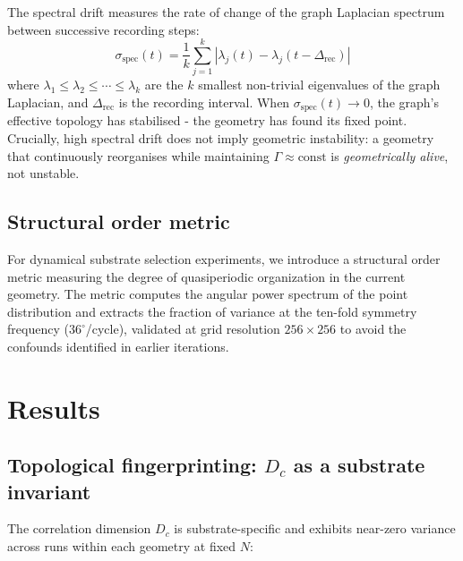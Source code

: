 \documentclass[12pt,a4paper]{article}
\theoremstyle{plain}
\theoremstyle{definition}
\begin{document}
The spectral drift measures the rate of change of the graph Laplacian
spectrum between successive recording steps:
\begin{equation}
\sigma_{\text{spec}}(t) = \frac{1}{k}\sum_{j=1}^{k}
  |\lambda_j(t) - \lambda_j(t - \Delta_{\text{rec}})|
\end{equation}
where $\lambda_1 \leq \lambda_2 \leq \cdots \leq \lambda_k$ are the
$k$ smallest non-trivial eigenvalues of the graph Laplacian, and
$\Delta_{\text{rec}}$ is the recording interval. When
$\sigma_{\text{spec}}(t) \to 0$, the graph's effective topology has
stabilised - the geometry has found its fixed point. Crucially, high
spectral drift does not imply geometric instability: a geometry that
continuously reorganises while maintaining $\Gamma \approx \text{const}$
is \emph{geometrically alive}, not unstable.

\subsection{Structural order metric}

For dynamical substrate selection experiments, we introduce a structural
order metric measuring the degree of quasiperiodic organization in the
current geometry. The metric computes the angular power spectrum of the
point distribution and extracts the fraction of variance at the
ten-fold symmetry frequency ($36^\circ$/cycle), validated at grid
resolution $256 \times 256$ to avoid the confounds identified in earlier
iterations.

\section{Results}
\label{sec:results}

\subsection{Topological fingerprinting: $D_c$ as a substrate invariant}

The correlation dimension $D_c$ is substrate-specific and exhibits
near-zero variance across runs within each geometry at fixed $N$:
\end{document}
